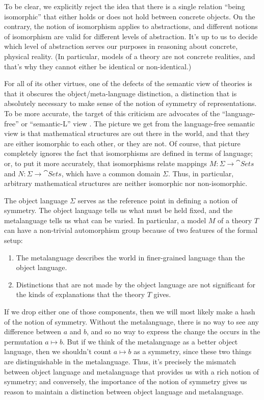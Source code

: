 To be clear, we explicitly reject the idea that there is a single
relation ``being isomorphic'' that either holds or does not hold
between concrete objects.  On the contrary, the notion of isomorphism
applies to abstractions, and different notions of isomorphism are
valid for different levels of abstraction.  It's up to us to decide
which level of abstraction serves our purposes in reasoning about
concrete, physical reality.  (In particular, models of a theory are
not concrete realities, and that's why they cannot either be identical
or non-identical.)

For all of its other virtues, one of the defects of the semantic view
of theories is that it obscures the object/meta-language distinction,
a distinction that is absolutely necessary to make sense of the notion
of symmetry of representations.  To be more accurate, the target of
this criticism are advocates of the ``language-free'' or
``semantic-L'' view \cite[see][]{halvorson2013}. The picture we get
from the language-free semantic view is that mathematical structures
are out there in the world, and that they are either isomorphic to
each other, or they are not.  Of course, that picture completely
ignores the fact that isomorphisms are defined in terms of language;
or, to put it more accurately, that isomorphisms relate mappings
$M:\Sigma\to\cat{Sets}$ and $N:\Sigma\to\cat{Sets}$, which have a
common domain $\Sigma$.  Thus, in particular, arbitrary mathematical
structures are neither isomorphic nor non-isomorphic.

The object language $\Sigma$ serves as the reference point in defining
a notion of symmetry.  The object language tells us what must be held
fixed, and the metalanguage tells us what can be varied.  In
particular, a model $M$ of a theory $T$ can have a non-trivial
automorphism group because of two features of the formal setup:
\begin{enumerate}
\item The metalanguage describes the world in finer-grained language
  than the object language.
\item Distinctions that are not made by the object language are not
  significant for the kinds of explanations that the theory $T$ gives.
\end{enumerate}
If we drop either one of those components, then we will most likely
make a hash of the notion of symmetry.  Without the metalanguage,
there is no way to see any difference between $a$ and $b$, and so no
way to express the change the occurs in the permutation $a\mapsto b$.
But if we think of the metalanguage as a better object language, then
we shouldn't count $a\mapsto b$ as a symmetry, since these two things
are distinguishable in the metalanguage.  Thus, it's precisely the
mismatch between object language and metalanguage that provides us
with a rich notion of symmetry; and conversely, the importance of the
notion of symmetry gives us reason to maintain a distinction between
object language and metalanguage.

